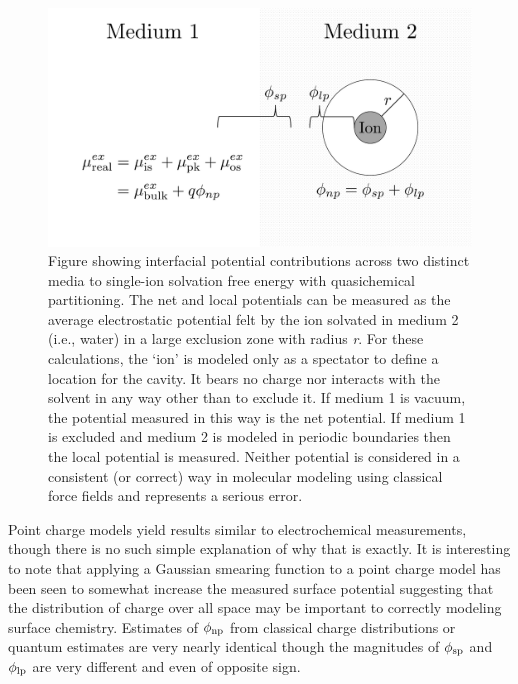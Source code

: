\begin{intro}
\begin{figure}
 \begin{center}
  \includegraphics[width=0.98\linewidth]{images/qct_sp.pdf}
  \caption[Illustration of interfacial potentials]{Figure showing interfacial potential contributions across two distinct media to single-ion solvation free energy with 
  quasichemical partitioning. The net and local potentials can be measured as the average electrostatic potential felt by the ion solvated in medium 2 (i.e., water) in 
  a large exclusion zone with radius \emph{r}. For these calculations, the `ion' is modeled only as a spectator to define a location for the cavity. It bears no charge 
  nor interacts with the solvent in any way other than to exclude it. If medium 1 is vacuum, the potential measured in this way is the net potential. If medium 1 is 
  excluded and medium 2 is modeled in periodic boundaries then the local potential is measured. Neither potential is considered in a consistent (or correct) way in 
  molecular modeling using classical force fields and represents a serious error.}
  \label{fig:potqct}
 \end{center} 
\end{figure}  

   Point charge models yield results similar to electrochemical measurements, though there is no such simple explanation of why that is exactly. It is interesting to 
   note that applying a Gaussian smearing function to a point charge model has been seen to somewhat increase the measured surface potential suggesting that the 
   distribution of charge over all space may be important to correctly modeling surface chemistry\cite{pratt1988gaussian_sp}. Estimates of $\phi_{\mathrm{np}}$ from classical 
   charge distributions or quantum estimates are very nearly identical though the magnitudes of $\phi_{\mathrm{sp}}$ and $\phi_{\mathrm{lp}}$ are very different and even of 
   opposite sign\cite{leung2009sp_mag,beck2013sp,remsing2014lp,warren2007hydration}. 
   

\end{intro}
